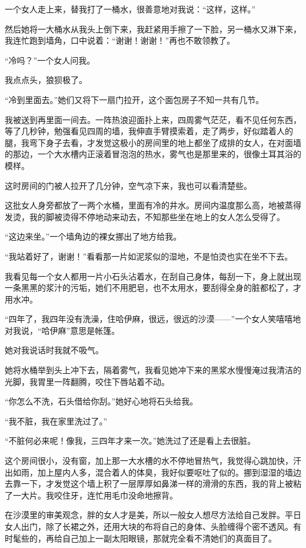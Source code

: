 \par 一个女人走上来，替我打了一桶水，很善意地对我说：“这样，这样。”
\par 然后她将一大桶水从我头上倒下来，我赶紧用手擦了一下脸，另一桶水又淋下来，我连忙跑到墙角，口中说着：“谢谢！谢谢！”再也不敢领教了。
\par “冷吗？”一个女人问我。
\par 我点点头，狼狈极了。
\par “冷到里面去。”她们又将下一扇门拉开，这个面包房子不知一共有几节。
\par 我被送到再里面一间去。一阵热浪迎面扑上来，四周雾气茫茫，看不见任何东西，等了几秒钟，勉强看见四周的墙，我伸直手臂摸索着，走了两步，好似踏着人的腿，我弯下身子去看，才发觉这极小的房间里的地上都坐了成排的女人，在对面墙的那边，一个大水槽内正滚着冒泡泡的热水，雾气也是那里来的，很像土耳其浴的模样。
\par 这时房间的门被人拉开了几分钟，空气凉下来，我也可以看清楚些。
\par 这批女人身旁都放了一两个水桶，里面有冷的井水。房间内温度那么高，地被蒸得发烫，我的脚被烫得不停地动来动去，不知那些坐在地上的女人怎么受得了。
\par “这边来坐。”一个墙角边的裸女挪出了地方给我。
\par “我站着好了，谢谢！”看看那一片如泥浆似的湿地，不是怕烫也实在坐不下去。
\par 我看见每一个女人都用一片小石头沾着水，在刮自己身体，每刮一下，身上就出现一条黑黑的浆汁的污垢，她们不用肥皂，也不太用水，要刮得全身的脏都松了，才用水冲。
\par “四年了，我四年没有洗澡，住哈伊麻，很远，很远的沙漠——”一个女人笑嘻嘻地对我说，“哈伊麻”意思是帐篷。
\par 她对我说话时我就不吸气。
\par 她将水桶举到头上冲下去，隔着雾气，我看见她冲下来的黑浆水慢慢淹过我清洁的光脚，我胃里一阵翻腾，咬住下唇站着不动。
\par “你怎么不洗，石头借给你刮。”她好心地将石头给我。
\par “我不脏，我在家里洗过了。”
\par “不脏何必来呢！像我，三四年才来一次。”她洗过了还是看上去很脏。
\par 这个房间很小，没有窗，加上那一大水槽的水不停地冒热气，我觉得心跳加快，汗出如雨，加上屋内人多，混合着人的体臭，我好似要呕吐了似的。挪到湿湿的墙边去靠一下，才发觉这个墙上积了一层厚厚如鼻涕一样的滑滑的东西，我的背上被粘了一大片。我咬住牙，连忙用毛巾没命地擦背。
\par 在沙漠里的审美观念，胖的女人才是美，所以一般女人想尽方法给自己发胖。平日女人出门，除了长裙之外，还用大块的布将自己的身体、头脸缠得个密不透风。有时髦些的，再给自己加上一副太阳眼镜，那就完全看不清她们的真面目了。

